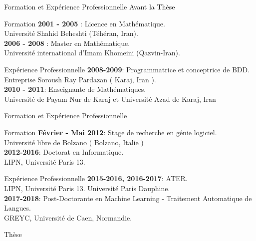 \documentclass{beamer}
\begin{document}
{

\begin{frame}{Formation et Expérience Professionnelle Avant la Thèse}

\begin{block}{Formation}
	\textbf{2001 - 2005} : Licence en Mathématique.\\
	Université Shahid Beheshti (Téhéran, Iran).\\
	\textbf{2006 - 2008} : Master en Mathématique. \\
	Université international d’Imam Khomeini (Qazvin-Iran).
\end{block}
\begin{block}{Expérience Professionnelle}
\textbf{2008-2009}: Programmatrice et conceptrice de BDD.\\
Entreprise Soroush Ray Pardazan ( Karaj, Iran ).\\
\textbf{2010 - 2011}: Enseignante de Mathématiques. \\
Université de Payam Nur de Karaj et Université Azad de Karaj, Iran
\end{block}

\end{frame}

\begin{frame}{Formation et Expérience Professionnelle}

\begin{block}{Formation}
\textbf{Février - Mai 2012}: Stage de recherche en génie logiciel.\\
Université libre de Bolzano ( Bolzano, Italie )\\
\textbf{2012-2016}: Doctorat en Informatique.\\
LIPN, Université Paris 13.
\end{block}

\begin{block}{Expérience Professionnelle}
\textbf{2015-2016, 2016-2017}: ATER.\\
LIPN, Université Paris 13. Université Paris Dauphine.\\
\textbf{2017-2018}: Post-Doctorante en Machine Learning - Traitement Automatique de Langues.\\
GREYC, Université de Caen, Normandie. 
\end{block}

\end{frame}
\begin{frame}{Thèse}


\end{frame}}
\end{document}
